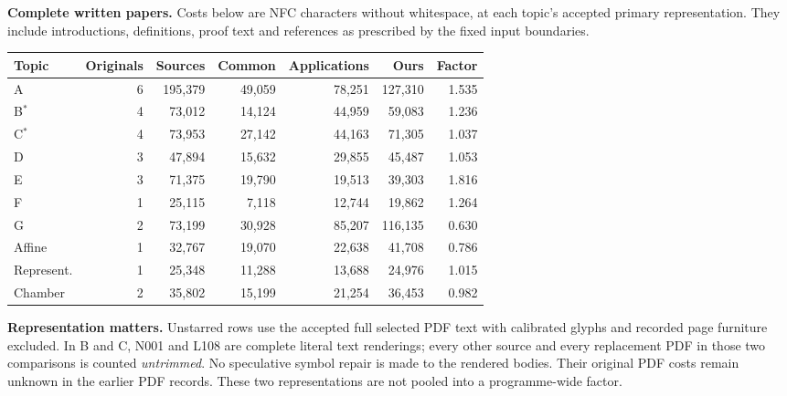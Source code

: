 \documentclass[11pt,a4paper]{article}
\newcommand{\smalltable}{\small\setlength{\tabcolsep}{5pt}\renewcommand{\arraystretch}{1.13}}
\begin{document}
\textbf{Complete written papers.} Costs below are NFC characters without whitespace, at each topic's accepted primary representation. They include introductions, definitions, proof text and references as prescribed by the fixed input boundaries.
\begin{center}\smalltable
\begin{tabular}{lrrrrrr}\toprule
Topic & Originals & Sources & Common & Applications & Ours & Factor\\\midrule
A & 6 & 195,379 & 49,059 & 78,251 & 127,310 & 1.535 \\
B$^*$ & 4 & 73,012 & 14,124 & 44,959 & 59,083 & 1.236 \\
C$^*$ & 4 & 73,953 & 27,142 & 44,163 & 71,305 & 1.037 \\
D & 3 & 47,894 & 15,632 & 29,855 & 45,487 & 1.053 \\
E & 3 & 71,375 & 19,790 & 19,513 & 39,303 & 1.816 \\
F & 1 & 25,115 & 7,118 & 12,744 & 19,862 & 1.264 \\
G & 2 & 73,199 & 30,928 & 85,207 & 116,135 & 0.630 \\
Affine & 1 & 32,767 & 19,070 & 22,638 & 41,708 & 0.786 \\
Represent. & 1 & 25,348 & 11,288 & 13,688 & 24,976 & 1.015 \\
Chamber & 2 & 35,802 & 15,199 & 21,254 & 36,453 & 0.982 \\
\bottomrule\end{tabular}\end{center}
\textbf{Representation matters.} Unstarred rows use the accepted full selected PDF text with calibrated glyphs and recorded page furniture excluded. In B and C, N001 and L108 are complete literal text renderings; every other source and every replacement PDF in those two comparisons is counted \emph{untrimmed}. No speculative symbol repair is made to the rendered bodies. Their original PDF costs remain unknown in the earlier PDF records. These two representations are not pooled into a programme-wide factor.
\end{document}
